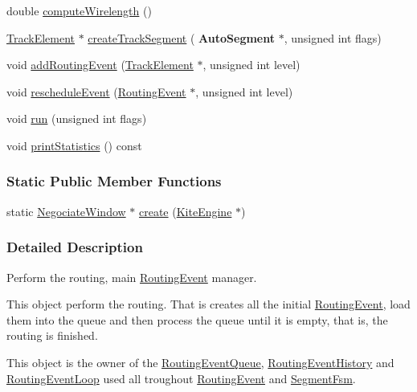 \begin{DoxyCompactItemize}
double \hyperlink{classKite_1_1NegociateWindow_a4936106670361df6b6f3ef0b6088c9dc}{compute\+Wirelength} ()
\item 
\hyperlink{classKite_1_1TrackElement}{Track\+Element} $\ast$ \hyperlink{classKite_1_1NegociateWindow_a7bf31fcd4e4007e62454689ef7c553fc}{create\+Track\+Segment} (\textbf{ Auto\+Segment} $\ast$, unsigned int flags)
\item 
void \hyperlink{classKite_1_1NegociateWindow_a51ba8e6a122c0cb93174027658cade63}{add\+Routing\+Event} (\hyperlink{classKite_1_1TrackElement}{Track\+Element} $\ast$, unsigned int level)
\item 
void \hyperlink{classKite_1_1NegociateWindow_acad8f73494d122463d65797d337ce275}{reschedule\+Event} (\hyperlink{classKite_1_1RoutingEvent}{Routing\+Event} $\ast$, unsigned int level)
\item 
void \hyperlink{classKite_1_1NegociateWindow_a61e848b73b597f54e2e83e13eb70ff83}{run} (unsigned int flags)
\item 
void \hyperlink{classKite_1_1NegociateWindow_a8d3dfaa30cedabd6b64977827ac989d8}{print\+Statistics} () const
\end{DoxyCompactItemize}
\subsubsection*{Static Public Member Functions}
\begin{DoxyCompactItemize}
\item 
static \hyperlink{classKite_1_1NegociateWindow}{Negociate\+Window} $\ast$ \hyperlink{classKite_1_1NegociateWindow_ad9c37ea1398a6dfa332cb297141dc1c4}{create} (\hyperlink{classKite_1_1KiteEngine}{Kite\+Engine} $\ast$)
\end{DoxyCompactItemize}


\subsubsection{Detailed Description}
Perform the routing, main \hyperlink{classKite_1_1RoutingEvent}{Routing\+Event} manager. 

This object perform the routing. That is creates all the initial \hyperlink{classKite_1_1RoutingEvent}{Routing\+Event}, load them into the queue and then process the queue until it is empty, that is, the routing is finished.

This object is the owner of the \hyperlink{classKite_1_1RoutingEventQueue}{Routing\+Event\+Queue}, \hyperlink{classKite_1_1RoutingEventHistory}{Routing\+Event\+History} and \hyperlink{classKite_1_1RoutingEventLoop}{Routing\+Event\+Loop} used all troughout \hyperlink{classKite_1_1RoutingEvent}{Routing\+Event} and \hyperlink{classKite_1_1SegmentFsm}{Segment\+Fsm}. 

